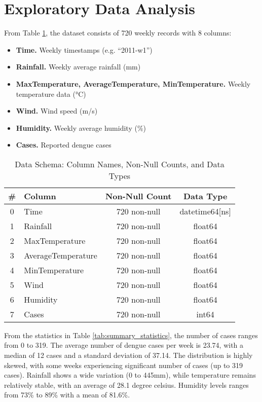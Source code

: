 \section{Exploratory Data Analysis}

From Table \ref{tab:data_schema}, the dataset consists of 720 weekly records with 8 columns:
\begin{itemize}
	\item \textbf{Time.} Weekly timestamps (e.g. ``2011-w1'')
	\item \textbf{Rainfall.} Weekly average rainfall (mm)
	\item \textbf{MaxTemperature, AverageTemperature, MinTemperature.} Weekly temperature data (°C)
	\item \textbf{Wind.} Wind speed (m/s)
	\item \textbf{Humidity.} Weekly average humidity (\%)
	\item \textbf{Cases.} Reported dengue cases
\end{itemize}

\begin{table}[h!]
	\centering
	\begin{tabular}{|c|l|c|c|}
		\hline
		\textbf{\#} & \textbf{Column} & \textbf{Non-Null Count} & \textbf{Data Type} \\
		\hline
		0 & Time & 720 non-null & datetime64[ns] \\
		\hline
		1 & Rainfall & 720 non-null & float64 \\
		\hline
		2 & MaxTemperature & 720 non-null & float64 \\
		\hline
		3 & AverageTemperature & 720 non-null & float64 \\
		\hline
		4 & MinTemperature & 720 non-null & float64 \\
		\hline
		5 & Wind & 720 non-null & float64 \\
		\hline
		6 & Humidity & 720 non-null & float64 \\
		\hline
		7 & Cases & 720 non-null & int64 \\
		\hline
	\end{tabular}
	\caption{Data Schema: Column Names, Non-Null Counts, and Data Types}
	\label{tab:data_schema}
\end{table}


From the statistics in Table \ref{tab:summary_statistics}, the number of cases ranges from 0 to 319. The average number of dengue cases per week is 23.74, with a median of 12 cases and a standard deviation of 37.14. The distribution is highly skewed, with some weeks experiencing significant number of cases (up to 319 cases). Rainfall shows a wide variation (0 to 445mm), while temperature remains relatively stable, with an average of 28.1 degree celsius. Humidity levels ranges from 73\% to 89\% with a mean of 81.6\%.

